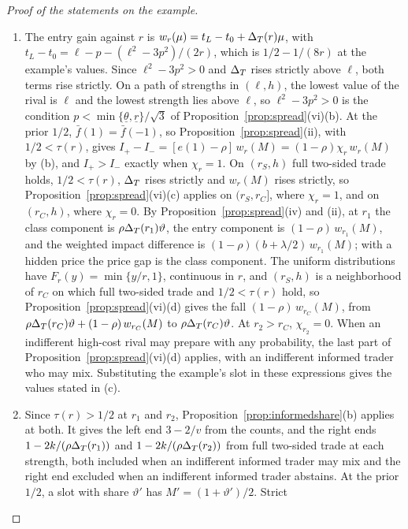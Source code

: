\begin{proof}[Proof of the statements on the example]
\begin{enumerate}[label=(\alph*),leftmargin=2em]
\(\rho\); at \(r_1\), \(\chi_{r_1}=1\). With a hidden price, entry is \(\rho\) after every order by
Proposition~\ref{prop:spread}(iv), because \(1/2<\tau(r)\).
\item The entry gain against \(r\) is \(w_r(\mu)=t_L-t_0+\Delta_T(r)\mu\), with \(t_L-t_0=\ell-p-(\ell^2-3p^2)/(2r)\), which is
\(1/2-1/(8r)\) at the example's values. Since \(\ell^2-3p^2>0\) and \(\Delta_T\) rises strictly above \(\ell\), both terms rise
strictly. On a path of strengths in \((\ell,h)\), the lowest value of the rival is \(\ell\) and the lowest strength lies above \(\ell\),
so \(\ell^2-3p^2>0\) is the condition \(p<\min\{\underline\theta,\underline r\}/\sqrt3\) of
Proposition~\ref{prop:spread}(vi)(b). At the prior \(1/2\), \(\bar f(1)=\bar f(-1)\), so
Proposition~\ref{prop:spread}(ii), with \(1/2<\tau(r)\), gives \(I_+-I_-=[e(1)-\rho]\,w_r(M)=(1-\rho)\chi_r\,w_r(M)\) by
(b), and \(I_+>I_-\) exactly when \(\chi_r=1\). On \((r_S,h)\) full two-sided trade holds, \(1/2<\tau(r)\), \(\Delta_T\)
rises strictly and \(w_r(M)\) rises strictly, so Proposition~\ref{prop:spread}(vi)(c) applies on \((r_S,r_C]\), where
\(\chi_r=1\), and on \((r_C,h)\), where \(\chi_r=0\). By Proposition~\ref{prop:spread}(iv) and (ii), at \(r_1\) the
class component is \(\rho\Delta_T(r_1)\vartheta\), the entry component is \((1-\rho)\,w_{r_1}(M)\), and the weighted impact
difference is \((1-\rho)(b+\lambda/2)\,w_{r_1}(M)\); with a hidden price the price gap is the class component. The
uniform distributions have \(F_r(y)=\min\{y/r,1\}\), continuous in \(r\), and \((r_S,h)\) is a neighborhood of \(r_C\) on which
full two-sided trade and \(1/2<\tau(r)\) hold, so Proposition~\ref{prop:spread}(vi)(d) gives the fall
\((1-\rho)\,w_{r_C}(M)\), from \(\rho\Delta_T(r_C)\vartheta+(1-\rho)\,w_{r_C}(M)\) to \(\rho\Delta_T(r_C)\vartheta\). At \(r_2>r_C\),
\(\chi_{r_2}=0\). When an indifferent high-cost rival may prepare with any probability, the last part of
Proposition~\ref{prop:spread}(vi)(d) applies, with an indifferent informed trader who may mix. Substituting the example's slot
in these expressions gives the values stated in (c).
\item Since \(\tau(r)>1/2\) at \(r_1\) and \(r_2\), Proposition~\ref{prop:informedshare}(b) applies at both. It gives the
left end \(3-2/v\) from the counts, and the right ends \(1-2k/(\rho\Delta_T(r_1))\) and \(1-2k/(\rho\Delta_T(r_2))\) from full
two-sided trade at each strength, both included when an indifferent informed trader may mix and the right end excluded when an
indifferent informed trader abstains. At the prior \(1/2\), a slot with share \(\vartheta'\) has \(M'=(1+\vartheta')/2\). Strict

\end{enumerate}
\end{proof}
